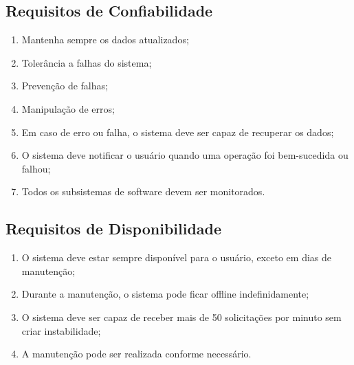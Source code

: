 \subsection{Requisitos de Confiabilidade }
\begin{enumerate}
  \item Mantenha sempre os dados atualizados;
  \item Tolerância a falhas do sistema;
  \item Prevenção de falhas;
  \item Manipulação de erros;
  \item Em caso de erro ou falha, o sistema deve ser capaz de recuperar os dados;
  \item O sistema deve notificar o usuário quando uma operação foi bem-sucedida ou falhou;
  \item Todos os subsistemas de software devem ser monitorados.
\end{enumerate}


\subsection{Requisitos de Disponibilidade }
\begin{enumerate}
  \item O sistema deve estar sempre disponível para o usuário, exceto em dias de manutenção;
  \item Durante a manutenção, o sistema pode ficar offline indefinidamente;
  \item O sistema deve ser capaz de receber mais de 50 solicitações por minuto sem criar instabilidade;
  \item A manutenção pode ser realizada conforme necessário.
\end{enumerate}



